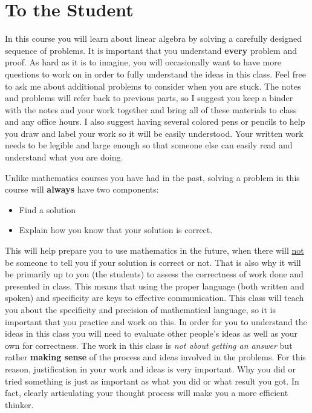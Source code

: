 \chapter{To the Student}

In this course you will learn about linear algebra by solving a carefully designed sequence of problems.  It is important that you understand \textbf{every} problem and proof. As hard as it is to imagine, you will occasionally want to have more questions to work on in order to fully understand the ideas in this class. Feel free to ask me about additional problems to consider when you are stuck. The notes and problems will refer back to previous parts, so I suggest you keep a binder with the notes and your work together and bring all of these materials to class and any office hours. I also suggest having several colored pens or pencils to help you draw and label your work so it will be easily understood. Your written work needs to be legible and large enough so that someone else can easily read and understand what you are doing.

Unlike mathematics courses you have had in the past, solving a problem in this course will \textbf{always} have two components:
\begin{itemize}
\item Find a solution
\item Explain how you know that your solution is correct.
\end{itemize}
This will help prepare you to use mathematics in the future, when there will \underline{not} be someone to tell you if your solution is correct or not. That is also why it will be primarily up to you (the students) to assess the correctness of work done and presented in class. This means that using the proper language (both written and spoken) and specificity are keys to effective communication. This class will teach you about the specificity and precision of mathematical language, so it is important that you practice and work on this. In order for you to understand the ideas in this class you will need to evaluate other people's ideas as well as your own for correctness. The work in this class is \emph{not about getting an answer} but rather \textbf{making sense} of the process and ideas involved in the problems. For this reason, justification in your work and ideas is very important. Why you did or tried something is just as important as what you did or what result you got. In fact, clearly articulating your thought process will make you a more efficient thinker.

